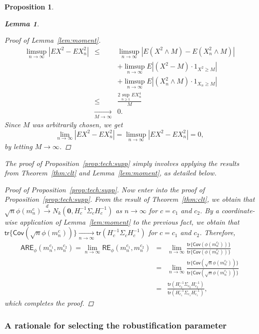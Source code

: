 \documentclass[preprint]{imsart}
\theoremstyle{plain}
\newtheorem{lemma}{Lemma}
\newtheorem{proposition}{Proposition}
\theoremstyle{remark}
\begin{document}
\begin{appendix}
\begin{proposition}
\begin{lemma}
\begin{proof}[Proof of Lemma~\ref{lem:moment}]
\begin{eqnarray*}
\limsup_{n \to \infty} |EX^2 - EX^2_{n}| &\le& \limsup_{n \to \infty} |E(X^2 \wedge M) - E(X^2_{n}\wedge M)| \\ 
& & + \limsup_{n \to \infty}E|(X^2 - M)\cdot 1_{X^2 \ge M}| \\ 
& & + \limsup_{n \to \infty} E|(X^2_{n} \wedge M)\cdot 1_{X_{n} \ge M}| \\
&\le& \frac{2\sup_{n \ge 1} EX^{4}_{n}}{M} \\ & \underset{M \to \infty}{\to}& 0.
\end{eqnarray*}
Since $M$ was arbitrarily chosen, we get $$\lim_{n \to \infty} |EX^2 - EX^2_{n}|= \limsup_{n \to \infty} |EX^2 - EX^2_{n}| = 0,$$ by letting $M \to \infty$.
\end{proof}
\end{lemma}

The proof of Proposition~\ref{prop:tech:supp} simply involves applying the results from Theorem~\ref{thm:clt} and Lemma~\ref{lem:moment}, as detailed below.
\begin{proof}[Proof of Proposition~\ref{prop:tech:supp}]
Now enter into the proof of Proposition~\ref{prop:tech:supp}. From the result of Theorem~\ref{thm:clt}, we obtain that $\sqrt{n}\phi(m^{c}_{n}) \overset{d}{\to} N_{k}(\mathbf{0}, H^{-1}_{c}\Sigma_{c}H^{-1}_{c})$ as $n\to\infty$ for $c= c_{1}$ and $c_2$. By a coordinate-wise application of Lemma~\ref{lem:moment} to the previous fact, we obtain that $\textsf{tr}\{\textsf{Cov}(\sqrt{n} \phi(m^{c}_{n}))\} \underset{n \to \infty}{\to} \textsf{tr}(H^{-1}_{c}\Sigma_{c}H^{-1}_{c})$ for $c=c_1$ and $c_2$. Therefore, 
\begin{eqnarray*}
\textsf{ARE}_{\phi}(m^{c_{1}}_{n}, m^{c_{2}}_{n}) = \lim_{n \rightarrow \infty} \textsf{RE}_{\phi}(m^{c_{1}}_{n}, m^{c_{2}}_{n}) 
&=& \lim_{n \rightarrow \infty} \frac{\textsf{tr}\{\textsf{Cov}(\phi(m^{c_{2}}_{n}))\}}{\textsf{tr}\{\textsf{Cov}(\phi(m^{c_{1}}_{n}))\}} \\
&=& \lim_{n \rightarrow \infty} \frac{\textsf{tr}\{\textsf{Cov}(\sqrt{n}\phi(m^{c_{2}}_{n}))\}}{\textsf{tr}\{\textsf{Cov}(\sqrt{n}\phi(m^{c_{1}}_{n}))\}} \\ 
&=&\frac{\textsf{tr}(H_{c_{2}}^{-1}\Sigma_{c_{2}} H_{c_{2}}^{-1})}{\textsf{tr}(H_{c_{1}}^{-1}\Sigma_{c_{1}} H_{c_{1}}^{-1})},
\end{eqnarray*}
which completes the proof.
\end{proof}
\end{proposition}



\subsubsection{A rationale for selecting the robustification parameter}



\end{appendix}
\end{document}
